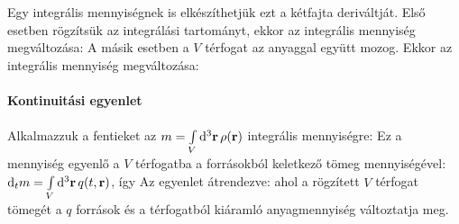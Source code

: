    Egy integrális mennyiségnek is elkészíthetjük ezt a kétfajta deriváltját. Első esetben rögzítsük az integrálási tartományt, ekkor az integrális mennyiség megváltozása:
   A másik esetben a $V$ térfogat az anyaggal együtt mozog. Ekkor az integrális mennyiség megváltozása: 
   
   \paragraph{Kontinuitási egyenlet}
    
    Alkalmazzuk a fentieket az $m=\int\limits_{V}^{}\mathrm{d}^3\mathbf{r}\,\rho(\mathbf{r})$ integrális mennyiségre:
    Ez a mennyiség egyenlő a $V$ térfogatba a forrásokból keletkező tömeg mennyiségével: $\mathrm{d}_t m=\int\limits_{V}^{}\mathrm{d}^3\mathbf{r}\, q(t,\mathbf{r})$, így
    Az egyenlet átrendezve:
    ahol a rögzített $V$ térfogat tömegét a $q$ források és a térfogatból kiáramló anyagmennyiség változtatja meg. 
    
